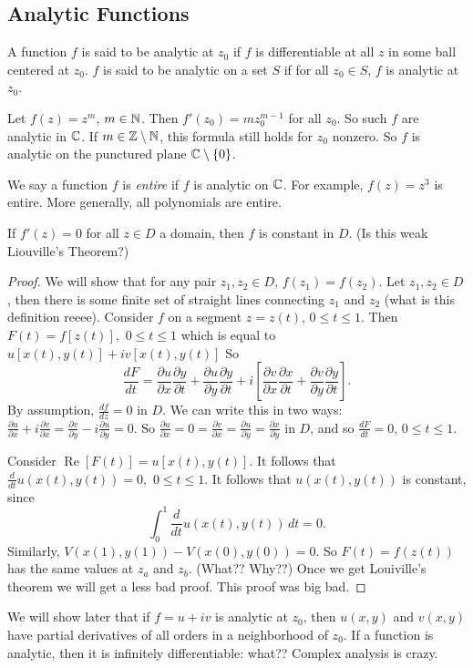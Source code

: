 \subsection{Analytic Functions}
\begin{definition}[Analytic]
    A function $f$ is said to be analytic at $z_0$ if $f$ is differentiable at all $z$ in some ball centered at $z_0$. $f$ is said to be analytic on a set $S$ if for all $z_0\in S$, $f$ is analytic at $z_0$.
\end{definition}
\begin{example}
    Let $f(z)=z^{m}$, $m\in \mathbb{N}$. Then $f'(z_0)=mz_0^{m-1}$ for all $z_0$. So such $f$ are analytic in $\mathbb{C}$. If $m\in \mathbb{Z}\setminus \mathbb{N}$, this formula still holds for $z_0$ nonzero. So $f$ is analytic on the punctured plane $\mathbb{C}\setminus \{0\} $.
\end{example}
\begin{definition}
    We say a function $f$ is \emph{entire} if $f$ is analytic on $\mathbb{C}$. For example, $f(z)=z^3$ is entire. More generally, all polynomials are entire.
\end{definition}
\begin{theorem}
    If $f'(z)=0$ for all $z\in D$ a domain, then $f$ is constant in $D$. (Is this weak Liouville's Theorem?)
\end{theorem}
\begin{proof}
    We will show that for any pair $z_1,z_2\in D$, $f(z_1)=f(z_2)$. Let $z_1,z_2\in D$, then there is some finite set of straight lines connecting $z_1$ and $z_2$ (what is this definition reeee). Consider $f$ on a segment $z=z(t)$, $0\leq t \leq 1$. Then $F(t)=f[z(t)],$ $0\leq t \leq 1$ which is equal to $u[x(t),y(t)]+iv[x(t),y(t)]$ So  \[
    \frac{dF}{dt}=\frac{\partial u}{\partial x}\frac{\partial y}{\partial t}+\frac{\partial u}{\partial y}\frac{\partial y}{\partial t}+i\left[ \frac{\partial v}{\partial x}\frac{\partial x}{\partial t}+\frac{\partial v}{\partial y}\frac{\partial y}{\partial t} \right] .
    \] By assumption, $\frac{df}{dz}=0$ in $D$. We can write this in two ways: $\frac{\partial u}{\partial x}+i \frac{\partial v}{\partial x}=\frac{\partial v}{\partial y}-i \frac{\partial u}{\partial y}=0.$ So $\frac{\partial u}{\partial x}=0=\frac{\partial v}{\partial x}=\frac{\partial u}{\partial y}=\frac{\partial x}{\partial y}$ in $D$, and so $\frac{dF}{dt}=0$, $0\leq t \leq 1$.

    Consider $\operatorname{Re}[F(t)]=u[x(t),y(t)]$. It follows that $\frac{d}{dt} u(x(t),y(t))=0,$ $0\leq t \leq 1$. It follows that $u(x(t),y(t))$ is constant, since \[
        \int_{0}^{1} \frac{d}{dt} u(x(t),y(t)) \, dt=0. 
    \] Similarly, $V(x(1),y(1))-V(x(0),y(0))=0$. So $F(t)=f(z(t))$ has the same values at $z_a$ and $z_b$. (What?? Why??) Once we get Louiville's theorem we will get a less bad proof. This proof was big bad.
\end{proof}
We will show later that if $f=u+iv$ is analytic at $z_0$, then $u(x,y)$ and $v(x,y)$ have partial derivatives of all orders in a neighborhood of $z_0$. If a function is analytic, then it is infinitely differentiable: what?? Complex analysis is crazy. 

